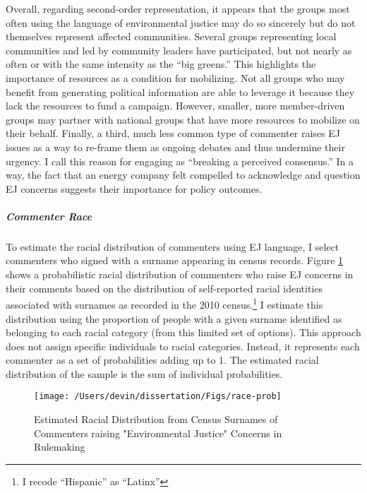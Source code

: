 \documentclass[
      12pt,
        ]{article}
\begin{document}
Overall, regarding second-order representation, it appears that the groups
most often using the language of environmental justice may do so
sincerely but do not themselves represent affected communities. Several
groups representing local communities and led by community leaders have
participated, but not nearly as often or with the same intensity as the
``big greens.'' This highlights the importance of resources as a condition
for mobilizing. Not all groups who may benefit from generating political
information are able to leverage it because they lack the resources to
fund a campaign. However, smaller, more
member-driven groups may partner with national groups that have more resources to
mobilize on their behalf.
Finally, a third, much less common type of commenter raises EJ issues
as a way to re-frame them as ongoing debates and thus undermine their
urgency. I call this reason for engaging as ``breaking a perceived
consensus.'' In a way, the fact that an energy company felt compelled to
acknowledge and question EJ concerns suggests their
importance for policy outcomes.

\hypertarget{commenter-race}{%
\subparagraph{Commenter Race}\label{commenter-race}}

To estimate the racial distribution of commenters
using EJ language, I select commenters who
signed with a
surname appearing in census records. Figure
\ref{fig:ejcommentsbyrace} shows a probabilistic racial
distribution of commenters who raise EJ concerns in
their comments based on the distribution of self-reported racial identities
associated with surnames as recorded in the 2010 census.\footnote{I recode ``Hispanic'' as ``Latinx''} I estimate this distribution using the proportion of people with a given surname identified as belonging to each racial
category (from this limited set of options). This approach does not
assign specific individuals to racial categories. Instead, it represents each commenter as a set of probabilities adding up to 1. The estimated racial distribution of the sample is the sum of individual probabilities.

\begin{figure}

{\centering \texttt{[image: /Users/devin/dissertation/Figs/race-prob]} 

}

\caption{Estimated Racial Distribution from Census Surnames of Commenters raising "Environmental Justice" Concerns in Rulemaking}\label{fig:ejcommentsbyrace}
\end{figure}
\end{document}
